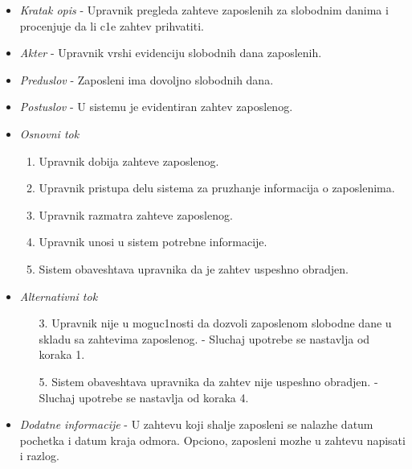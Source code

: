 \documentclass[10 pt]{article}
\begin{document}
		\begin{itemize}
			
			\item\textit{Kratak opis} - Upravnik pregleda zahteve zaposlenih za slobodnim danima i procenjuje da li c1e zahtev prihvatiti. 

				
			\item\textit{Akter} - Upravnik vrshi evidenciju slobodnih dana zaposlenih.

			
			\item\textit{Preduslov} - Zaposleni ima dovoljno slobodnih dana.

			
			\item\textit{Postuslov} - U sistemu je evidentiran zahtev zaposlenog.

			
			\item\textit{Osnovni tok}
				\begin{enumerate}
					\item Upravnik dobija zahteve zaposlenog. 

					\item Upravnik pristupa delu sistema za pruzhanje informacija o zaposlenima.

					\item Upravnik razmatra zahteve zaposlenog.

					\item Upravnik unosi u sistem potrebne informacije.

					\item Sistem obaveshtava upravnika da je zahtev uspeshno obradjen.

				\end{enumerate}
			
			\item\textit{Alternativni tok}
				\begin{enumerate}
					\item [3.] Upravnik nije u moguc1nosti da dozvoli zaposlenom slobodne dane u skladu sa zahtevima zaposlenog.
- Sluchaj upotrebe se nastavlja od koraka 1.

					\item [5.] Sistem obaveshtava upravnika da zahtev nije uspeshno obradjen. - Sluchaj upotrebe se nastavlja od koraka 4.
			
				\end{enumerate}
			
			\item\textit{Dodatne informacije} - U zahtevu koji shalje zaposleni se nalazhe datum pochetka i datum kraja odmora. Opciono, zaposleni mozhe u zahtevu napisati i razlog.

			
		\end{itemize}
		
\end{document}
